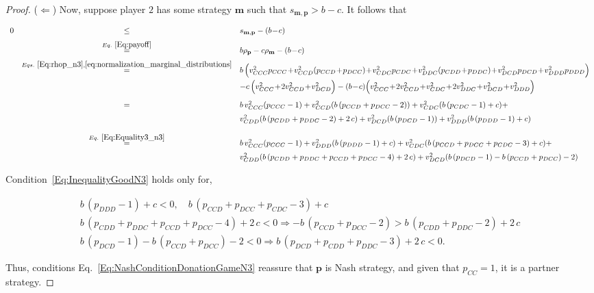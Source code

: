\documentclass[11pt]{article}
\theoremstyle{plainCl1}
\theoremstyle{plainCl2}
\begin{document}
\begin{proof}
($\Leftarrow$) Now, suppose player $2$ has some strategy $\mathbf{m}$ 
such that $s_{\mathbf{m}, \mathbf{p}} > b\!-\!c$. It follows that

\begin{equation}\label{Eq:InequalityGoodN3}
\begin{array}{rcl}
0 &\le	&s_{\mathbf{m}, \mathbf{p}}-(b\!-\!c)\\[0.2cm]
	&\stackrel{Eq.~\eqref{Eq:payoff}}{=}	&b\rho_\mathbf{p} - c\rho_\mathbf{m}-(b\!-\!c)\\[0.2cm]
	&\stackrel{Eqs.~\eqref{Eq:rhop_n3}, \eqref{eq:normalization_marginal_distributions}}{=}	& 
  b\,\Big( v^2_{CCC} p_{CCC} \!+\!  v^2_{CCD}(p_{CCD}\!+\!p_{DCC}) \!+\! v^2_{CDC} p_{CDC} \!+\! v^2_{DDC}(p_{CDD}\!+\!p_{DDC}) \!+\! v^2_{DCD} p_{DCD} \!+\! v^2_{DDD} p_{DDD}\Big) \\ [0.2cm]
  & & - c\,\Big(v^2_{CCC} \!+\! 2 v^2_{CCD} \!+\! v^2_{DCD}\Big) - (b\!-\!c)\Big(v^2_{CCC} \!+\! 2 v^2_{CCD} \!+\! v^2_{CDC} \!+\! 2 v^2_{DDC} \!+\! v^2_{DCD} \!+\! v^2_{DDD} \Big) \\ [0.4cm]
  & = & b\, v^2_{CCC} (p_{CCC} - 1) + v^2_{CCD} (b\, (p_{CCD} + p_{DCC} - 2)) + v^2_{CDC} (b\, (p_{CDC} - 1) + c) + \\ [0.2cm]
  & & v^2_{CDD} (b\, (p_{CDD} + p_{DDC} - 2) + 2\, c) + v^2_{DCD} (b\, (p _{DCD} - 1)) + v^2_{DDD} (b\, (p _{DDD} - 1) + c) \\ [0.4cm]
  &\stackrel{Eq.~\eqref{Eq:Equality3_n3}}{=}	& b\, v^2_{CCC} (p_{CCC} - 1) + v^2_{DDD} (b\, (p _{DDD} - 1) + c) + v^2_{CDC} (b\, (p_{CCD} + p_{DCC} + p_{CDC}- 3) + c) + \\ [0.2cm]
  & & v^2_{CDD} (b\, (p_{CDD} + p_{DDC} + p_{CCD} + p_{DCC} - 4) + 2\, c) + v^2_{DCD} (b\, (p _{DCD}  - 1) -  b\, (p_{CCD} + p_{DCC}) - 2)
\end{array}
\end{equation}

Condition~\eqref{Eq:InequalityGoodN3} holds only for,

\begin{equation*}
\begin{array}{c}
b\, (p _{DDD} - 1) + c < 0,  \quad b\, (p_{CCD} + p_{DCC} + p_{CDC}- 3) + c \\ [0.4cm]
b\, (p_{CDD} + p_{DDC} + p_{CCD} + p_{DCC} - 4) + 2\, c < 0 \Rightarrow - b\, (p_{CCD} + p_{DCC} - 2) > b\, (p_{CDD} + p_{DDC} - 2) + 2\, c \\ [0.4cm]
b\, (p _{DCD}  - 1) -  b\, (p_{CCD} + p_{DCC}) - 2 < 0 \Rightarrow  b\, (p _{DCD} + p_{CDD} + p_{DDC} - 3) + 2\, c < 0.
\end{array}
\end{equation*}

Thus, conditions Eq.~\eqref{Eq:NashConditionDonationGameN3} reassure that
$\mathbf{p}$ is Nash strategy, and given that $p_{CC} = 1$, it is a partner
strategy.
\end{proof}
\end{document}
